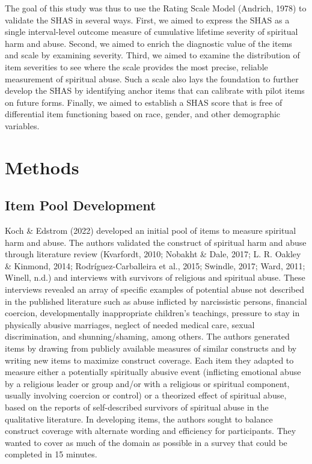 \documentclass[
  letterpaper,
]{article}
\begin{document}
The goal of this study was thus to use the Rating Scale Model (Andrich,
1978) to validate the SHAS in several ways. First, we aimed to express
the SHAS as a single interval-level outcome measure of cumulative
lifetime severity of spiritual harm and abuse. Second, we aimed to
enrich the diagnostic value of the items and scale by examining
severity. Third, we aimed to examine the distribution of item severities
to see where the scale provides the most precise, reliable measurement
of spiritual abuse. Such a scale also lays the foundation to further
develop the SHAS by identifying anchor items that can calibrate with
pilot items on future forms. Finally, we aimed to establish a SHAS score
that is free of differential item functioning based on race, gender, and
other demographic variables.


\chapter*{Methods}\label{methods}


\section*{Item Pool Development}\label{item-pool-development}


Koch \& Edstrom (2022) developed an initial pool of items to measure
spiritual harm and abuse. The authors validated the construct of
spiritual harm and abuse through literature review (Kvarfordt, 2010;
Nobakht \& Dale, 2017; L. R. Oakley \& Kinmond, 2014;
Rodríguez-Carballeira et al., 2015; Swindle, 2017; Ward, 2011; Winell,
n.d.) and interviews with survivors of religious and spiritual abuse.
These interviews revealed an array of specific examples of potential
abuse not described in the published literature such as abuse inflicted
by narcissistic persons, financial coercion, developmentally
inappropriate children's teachings, pressure to stay in physically
abusive marriages, neglect of needed medical care, sexual
discrimination, and shunning/shaming, among others. The authors
generated items by drawing from publicly available measures of similar
constructs and by writing new items to maximize construct coverage. Each
item they adapted to measure either a potentially spiritually abusive
event (inflicting emotional abuse by a religious leader or group and/or
with a religious or spiritual component, usually involving coercion or
control) or a theorized effect of spiritual abuse, based on the reports
of self-described survivors of spiritual abuse in the qualitative
literature. In developing items, the authors sought to balance construct
coverage with alternate wording and efficiency for participants. They
wanted to cover as much of the domain as possible in a survey that could
be completed in 15 minutes.
\end{document}
